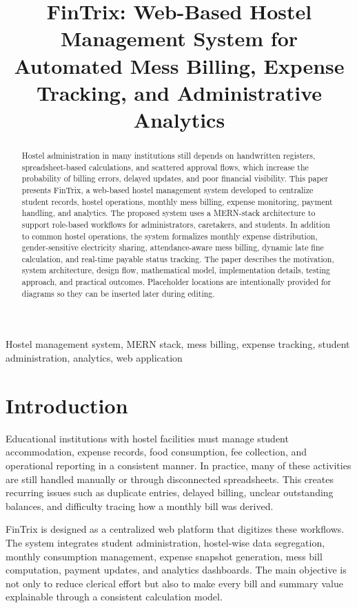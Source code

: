 \documentclass[conference]{IEEEtran}
\title{FinTrix: Web-Based Hostel Management System for Automated Mess Billing, Expense Tracking, and Administrative Analytics}
\author{
\IEEEauthorblockN{Your Name}
\IEEEauthorblockA{
Department of Computer Applications\\
Your College or University\\
City, State, Country\\
email@example.com
}
}
\begin{document}
\maketitle

\begin{abstract}
Hostel administration in many institutions still depends on handwritten registers, spreadsheet-based calculations, and scattered approval flows, which increase the probability of billing errors, delayed updates, and poor financial visibility. This paper presents FinTrix, a web-based hostel management system developed to centralize student records, hostel operations, monthly mess billing, expense monitoring, payment handling, and analytics. The proposed system uses a MERN-stack architecture to support role-based workflows for administrators, caretakers, and students. In addition to common hostel operations, the system formalizes monthly expense distribution, gender-sensitive electricity sharing, attendance-aware mess billing, dynamic late fine calculation, and real-time payable status tracking. The paper describes the motivation, system architecture, design flow, mathematical model, implementation details, testing approach, and practical outcomes. Placeholder locations are intentionally provided for diagrams so they can be inserted later during editing.
\end{abstract}

\begin{IEEEkeywords}
Hostel management system, MERN stack, mess billing, expense tracking, student administration, analytics, web application
\end{IEEEkeywords}

\section{Introduction}
Educational institutions with hostel facilities must manage student accommodation, expense records, food consumption, fee collection, and operational reporting in a consistent manner. In practice, many of these activities are still handled manually or through disconnected spreadsheets. This creates recurring issues such as duplicate entries, delayed billing, unclear outstanding balances, and difficulty tracing how a monthly bill was derived.

FinTrix is designed as a centralized web platform that digitizes these workflows. The system integrates student administration, hostel-wise data segregation, monthly consumption management, expense snapshot generation, mess bill computation, payment updates, and analytics dashboards. The main objective is not only to reduce clerical effort but also to make every bill and summary value explainable through a consistent calculation model.
\end{document}
